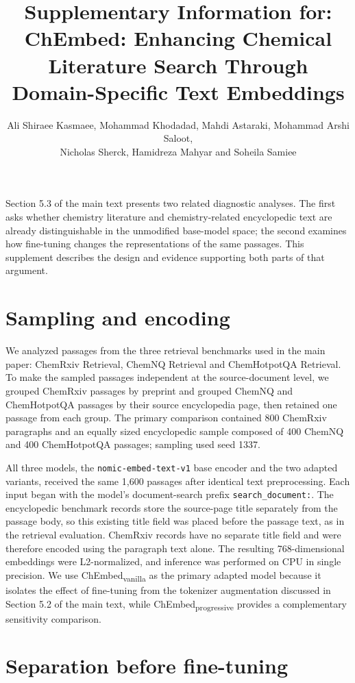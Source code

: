 \documentclass[11pt]{article}
\title{%
  \large\textbf{Supplementary Information for:}\\[6pt]
  \Large\textbf{ChEmbed: Enhancing Chemical Literature Search Through\\Domain-Specific Text Embeddings}%
}
\author{%
  \normalsize Ali Shiraee Kasmaee, Mohammad Khodadad, Mahdi Astaraki, Mohammad Arshi Saloot,\\
  \normalsize Nicholas Sherck, Hamidreza Mahyar and Soheila Samiee
}
\date{}
\newcommand{\CEv}{ChEmbed\textsubscript{vanilla}}
\newcommand{\CEp}{ChEmbed\textsubscript{progressive}}
\begin{document}
\maketitle
\vspace{-1.5em}

Section 5.3 of the main text presents two related diagnostic analyses. The
first asks whether chemistry literature and chemistry-related encyclopedic
text are already distinguishable in the unmodified base-model space; the
second examines how fine-tuning changes the representations of the same
passages. This supplement describes the design and evidence supporting both
parts of that argument.

\section{Sampling and encoding}
\label{sec:esi-sampling}

We analyzed passages from the three retrieval benchmarks used in the main
paper: ChemRxiv Retrieval, ChemNQ Retrieval and ChemHotpotQA Retrieval. To make
the sampled passages independent at the source-document level, we grouped
ChemRxiv passages by preprint and grouped ChemNQ and ChemHotpotQA passages by
their source encyclopedia page, then retained one passage from each group. The
primary comparison contained 800 ChemRxiv paragraphs and an equally sized
encyclopedic sample composed of 400 ChemNQ and 400 ChemHotpotQA passages;
sampling used seed 1337.

All three models, the \texttt{nomic-embed-text-v1} base encoder and the two
adapted variants, received the same 1{,}600 passages after identical text
preprocessing. Each input began with the model's document-search prefix
\texttt{search\_document:}. The encyclopedic benchmark records store the
source-page title separately from the passage body, so this existing title
field was placed before the passage text, as in the retrieval evaluation.
ChemRxiv records have no separate title field and were therefore encoded using
the paragraph text alone. The resulting
768-dimensional embeddings were L2-normalized, and inference was performed on
CPU in single precision. We use \CEv{} as the primary adapted model because it
isolates the effect of fine-tuning from the tokenizer augmentation discussed in
Section 5.2 of the main text, while \CEp{} provides a complementary sensitivity
comparison.

\section{Separation before fine-tuning}
\label{sec:esi-separation}
\end{document}
